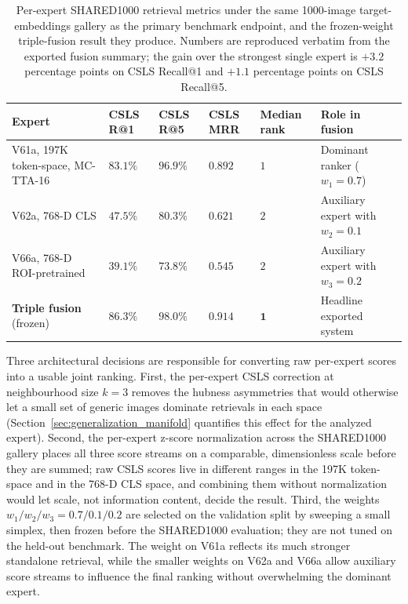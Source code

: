 \begin{table}[htbp]
\centering
\footnotesize
\begin{tabularx}{\textwidth}{>{\raggedright\arraybackslash}p{4.0cm} >{\centering\arraybackslash}p{1.4cm} >{\centering\arraybackslash}p{1.4cm} >{\centering\arraybackslash}p{1.4cm} >{\centering\arraybackslash}p{1.4cm} >{\raggedright\arraybackslash}X}
\toprule
\textbf{Expert} & \textbf{CSLS R@1} & \textbf{CSLS R@5} & \textbf{CSLS MRR} & \textbf{Median rank} & \textbf{Role in fusion} \\
\midrule
V61a, 197K token-space, MC-TTA-16 & $83.1\%$ & $96.9\%$ & $0.892$ & $1$ & Dominant ranker ($w_1 = 0.7$) \\
V62a, 768-D CLS & $47.5\%$ & $80.3\%$ & $0.621$ & $2$ & Auxiliary expert with $w_2 = 0.1$ \\
V66a, 768-D ROI-pretrained & $39.1\%$ & $73.8\%$ & $0.545$ & $2$ & Auxiliary expert with $w_3 = 0.2$ \\
\midrule
\textbf{Triple fusion} (frozen) & $\mathbf{86.3\%}$ & $\mathbf{98.0\%}$ & $\mathbf{0.914}$ & $\mathbf{1}$ & Headline exported system \\
\bottomrule
\end{tabularx}
\caption{Per-expert SHARED1000 retrieval metrics under the same 1000-image target-embeddings gallery as the primary benchmark endpoint, and the frozen-weight triple-fusion result they produce. Numbers are reproduced verbatim from the exported fusion summary; the gain over the strongest single expert is $+3.2$ percentage points on CSLS Recall@1 and $+1.1$ percentage points on CSLS Recall@5.}
\label{tab:expert_complementarity}
\end{table}

Three architectural decisions are responsible for converting raw per-expert scores into a usable joint ranking. First, the per-expert CSLS correction at neighbourhood size $k=3$ removes the hubness asymmetries that would otherwise let a small set of generic images dominate retrievals in each space (Section~\ref{sec:generalization_manifold} quantifies this effect for the analyzed expert). Second, the per-expert z-score normalization across the SHARED1000 gallery places all three score streams on a comparable, dimensionless scale before they are summed; raw CSLS scores live in different ranges in the 197K token-space and in the 768-D CLS space, and combining them without normalization would let scale, not information content, decide the result. Third, the weights $w_1/w_2/w_3 = 0.7/0.1/0.2$ are selected on the validation split by sweeping a small simplex, then frozen before the SHARED1000 evaluation; they are not tuned on the held-out benchmark. The weight on V61a reflects its much stronger standalone retrieval, while the smaller weights on V62a and V66a allow auxiliary score streams to influence the final ranking without overwhelming the dominant expert.


